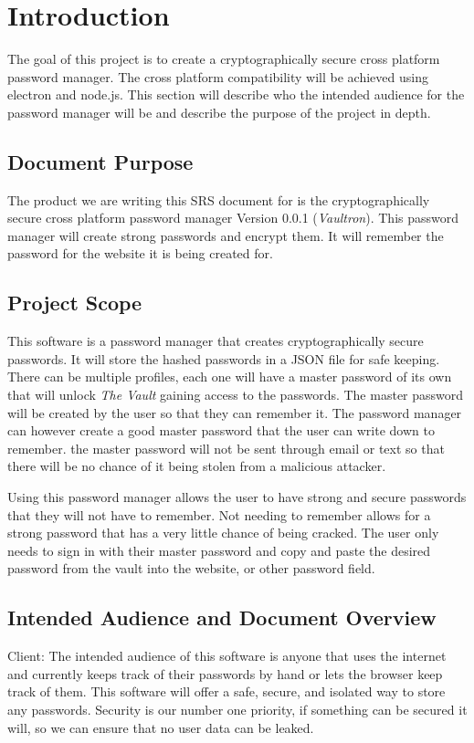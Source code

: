 \documentclass[11pt]{report}
\begin{document}
\clearpage


\tableofcontents{}

\chapter{Introduction}
The goal of this project is to create a cryptographically
secure cross platform password manager. The cross platform
compatibility will be achieved using electron and node.js.
This section will describe who the intended audience for the
password manager will be and describe the purpose of the
project in depth.


\section{Document Purpose}
The product we are writing this SRS document for is the cryptographically
secure cross platform password manager Version 0.0.1 (\textit{Vaultron}). This password manager 
will create strong passwords and encrypt them. It will remember the password 
for the website it is being created for.


\section{Project Scope}
This software is a password manager that creates cryptographically secure 
passwords. It will store the hashed passwords in a JSON file for safe keeping.
There can be multiple profiles, each one will have a master password of its own 
that will unlock \textit{The Vault} gaining access to the passwords. The master password
will be created by the user so that they can remember it. The password manager 
can however create a good master password that the user can write down to remember.
the master password will not be sent through email or text so that there will
be no chance of it being stolen from a malicious attacker.

Using this password manager allows the user to have strong and secure passwords 
that they will not have to remember. Not needing to remember allows for a strong 
password that has a very little chance of being cracked. The user only needs to sign
in with their master password and copy and paste the desired password from the 
vault into the website, or other password field.


\section{Intended Audience and Document Overview}
Client: The intended audience of this software is anyone that uses the internet 
and currently keeps track of their passwords by hand or lets the browser
keep track of them. This software will offer a safe, secure, and isolated
way to store any passwords. Security is our number one priority, if something
can be secured it will, so we can ensure that no user data can be leaked.
\end{document}
